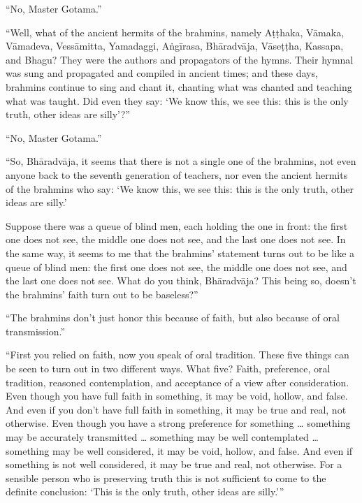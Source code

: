 \documentclass[12pt,openany]{book}%
\begin{document}
“No, Master Gotama.” 

“Well, what of the ancient hermits of the brahmins, namely \textsanskrit{Aṭṭhaka}, \textsanskrit{Vāmaka}, \textsanskrit{Vāmadeva}, \textsanskrit{Vessāmitta}, Yamadaggi, \textsanskrit{Aṅgīrasa}, \textsanskrit{Bhāradvāja}, \textsanskrit{Vāseṭṭha}, Kassapa, and Bhagu? They were the authors and propagators of the hymns. Their hymnal was sung and propagated and compiled in ancient times; and these days, brahmins continue to sing and chant it, chanting what was chanted and teaching what was taught. Did even they say: ‘We know this, we see this: this is the only truth, other ideas are silly’?” 

“No, Master Gotama.” 

“So, \textsanskrit{Bhāradvāja}, it seems that there is not a single one of the brahmins, not even anyone back to the seventh generation of teachers, nor even the ancient hermits of the brahmins who say: ‘We know this, we see this: this is the only truth, other ideas are silly.’ 

Suppose there was a queue of blind men, each holding the one in front: the first one does not see, the middle one does not see, and the last one does not see. In the same way, it seems to me that the brahmins’ statement turns out to be like a queue of blind men: the first one does not see, the middle one does not see, and the last one does not see. What do you think, \textsanskrit{Bhāradvāja}? This being so, doesn’t the brahmins’ faith turn out to be baseless?” 

“The brahmins don’t just honor this because of faith, but also because of oral transmission.” 

“First you relied on faith, now you speak of oral tradition. These five things can be seen to turn out in two different ways. What five? Faith, preference, oral tradition, reasoned contemplation, and acceptance of a view after consideration. Even though you have full faith in something, it may be void, hollow, and false. And even if you don’t have full faith in something, it may be true and real, not otherwise. Even though you have a strong preference for something … something may be accurately transmitted … something may be well contemplated … something may be well considered, it may be void, hollow, and false. And even if something is not well considered, it may be true and real, not otherwise. For a sensible person who is preserving truth this is not sufficient to come to the definite conclusion: ‘This is the only truth, other ideas are silly.’” 
\end{document}
